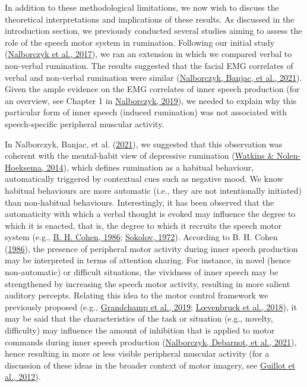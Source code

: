\documentclass[
  man, donotrepeattitle,floatsintext]{apa6}
\begin{document}
In addition to these methodological limitations, we now wish to discuss the theoretical interpretations and implications of these results. As discussed in the introduction section, we previously conducted several studies aiming to assess the role of the speech motor system in rumination. Following our initial study (\protect\hyperlink{ref-nalborczyk_orofacial_2017}{Nalborczyk et al., 2017}), we ran an extension in which we compared verbal to non-verbal rumination. The results suggested that the facial EMG correlates of verbal and non-verbal rumination were similar (\protect\hyperlink{ref-nalborczyk_dissociating_2021}{Nalborczyk, Banjac, et al., 2021}). Given the ample evidence on the EMG correlates of inner speech production (for an overview, see Chapter 1 in \protect\hyperlink{ref-nalborczyk_understanding_2019}{Nalborczyk, 2019}), we needed to explain why this particular form of inner speech (induced rumination) was not associated with speech-specific peripheral muscular activity.

In Nalborczyk, Banjac, et al. (\protect\hyperlink{ref-nalborczyk_dissociating_2021}{2021}), we suggested that this observation was coherent with the mental-habit view of depressive rumination (\protect\hyperlink{ref-watkins_habit-goal_2014}{Watkins \& Nolen-Hoeksema, 2014}), which defines rumination as a habitual behaviour, automatically triggered by contextual cues such as negative mood. We know habitual behaviours are more automatic (i.e., they are not intentionally initiated) than non-habitual behaviours. Interestingly, it has been observed that the automaticity with which a verbal thought is evoked may influence the degree to which it is enacted, that is, the degree to which it recruits the speech motor system (e.g., \protect\hyperlink{ref-cohen_motor_1986}{B. H. Cohen, 1986}; \protect\hyperlink{ref-sokolov_inner_1972}{Sokolov, 1972}). According to B. H. Cohen (\protect\hyperlink{ref-cohen_motor_1986}{1986}), the presence of peripheral motor activity during inner speech production may be interpreted in terms of attention sharing. For instance, in novel (hence non-automatic) or difficult situations, the vividness of inner speech may be strengthened by increasing the speech motor activity, resulting in more salient auditory percepts. Relating this idea to the motor control framework we previously proposed (e.g., \protect\hyperlink{ref-grandchamp_condialint_2019}{Grandchamp et al., 2019}; \protect\hyperlink{ref-loevenbruck_cognitive_2018}{Lœvenbruck et al., 2018}), it may be said that the characteristics of the task or situation (e.g., novelty, difficulty) may influence the amount of inhibition that is applied to motor commands during inner speech production (\protect\hyperlink{ref-nalborczyk_role_2021}{Nalborczyk, Debarnot, et al., 2021}), hence resulting in more or less visible peripheral muscular activity (for a discussion of these ideas in the broader context of motor imagery, see \protect\hyperlink{ref-guillot_imagining_2012}{Guillot et al., 2012}).
\end{document}
